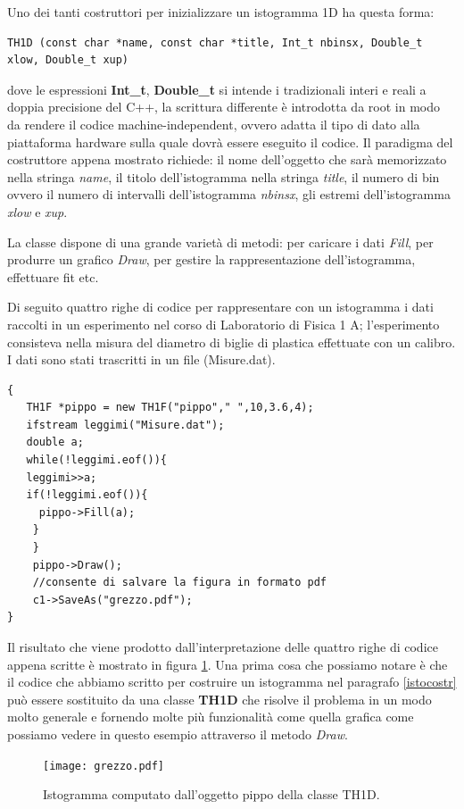 \documentclass[11pt,fleqn]{book} %
\begin{document}
Uno dei tanti costruttori per inizializzare un istogramma 1D ha questa forma:
\begin{verbatim}
TH1D (const char *name, const char *title, Int_t nbinsx, Double_t xlow, Double_t xup)
\end{verbatim}
dove le espressioni \textbf{Int\_t}, \textbf{Double\_t} si intende i tradizionali interi e reali a doppia precisione del C++, la scrittura differente è introdotta da root in modo da rendere il codice machine-independent, ovvero adatta il tipo di dato alla piattaforma hardware sulla quale dovrà essere eseguito il codice.
Il paradigma del costruttore appena mostrato richiede: il nome dell'oggetto che sarà memorizzato nella stringa \textit{name}, il titolo dell'istogramma nella stringa \textit{title}, il numero di bin ovvero il numero di intervalli dell'istogramma \textit{nbinsx}, gli estremi dell'istogramma \textit{xlow} e \textit{xup}.

La classe dispone di una grande varietà di metodi: per caricare i dati \textit{Fill}, per produrre un grafico \textit{Draw}, per gestire la rappresentazione dell'istogramma, effettuare fit etc.

Di seguito quattro righe di codice per rappresentare con un istogramma i dati raccolti in un esperimento nel corso di Laboratorio di Fisica 1 A;
l'esperimento consisteva nella misura del diametro di biglie di plastica effettuate con un calibro. I dati sono stati trascritti in un file (Misure.dat).

\begin{verbatim}
{
   TH1F *pippo = new TH1F("pippo"," ",10,3.6,4);
   ifstream leggimi("Misure.dat");
   double a;
   while(!leggimi.eof()){
   leggimi>>a;
   if(!leggimi.eof()){
     pippo->Fill(a);
    }
    }
    pippo->Draw();
    //consente di salvare la figura in formato pdf
    c1->SaveAs("grezzo.pdf");
}
\end{verbatim}

Il risultato che viene prodotto dall'interpretazione delle quattro righe di codice appena scritte è mostrato in figura \ref{grezzo}.
Una prima cosa che possiamo notare è che il codice che abbiamo scritto per costruire un istogramma nel paragrafo \ref{istocostr} può essere sostituito da una classe \textbf{TH1D} che risolve il problema in un modo molto generale e fornendo molte più funzionalità come quella grafica come possiamo vedere in questo esempio attraverso il metodo \textit{Draw}.
\begin{figure}
\centering
\texttt{[image: grezzo.pdf]}
\caption{Istogramma computato dall'oggetto pippo della classe TH1D.\label{grezzo}}
\end{figure}
\end{document}
